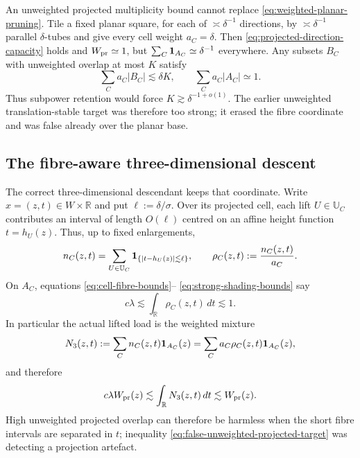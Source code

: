 \documentclass[11pt]{article}
\begin{document}
An unweighted projected multiplicity bound cannot replace
\eqref{eq:weighted-planar-pruning}.  Tile a fixed planar square, for each of
\(\asymp\delta^{-1}\) directions, by \(\asymp\delta^{-1}\) parallel
\(\delta\)-tubes and give every cell weight \(a_C=\delta\).  Then
\eqref{eq:projected-direction-capacity} holds and \(W_{\rm pr}\simeq1\), but
\(\sum_C{\bf1}_{A_C}\simeq\delta^{-1}\) everywhere.  Any subsets \(B_C\)
with unweighted overlap at most \(K\) satisfy
\begin{equation}\label{eq:false-unweighted-projected-target}
 \sum_Ca_C|B_C|\lesssim\delta K,
 \qquad
 \sum_Ca_C|A_C|\simeq1.
\end{equation}
Thus subpower retention would force \(K\gtrsim\delta^{-1+o(1)}\).  The earlier
unweighted translation-stable target was therefore too strong; it erased the
fibre coordinate and was false already over the planar base.

\subsection{The fibre-aware three-dimensional descent}

The correct three-dimensional descendant keeps that coordinate.  Write
\(x=(z,t)\in W\times\mathbb R\) and put \(\ell:=\delta/\sigma\).  Over its
projected cell, each lift \(U\in\mathbb U_C\) contributes an interval of length
\(O(\ell)\) centred on an affine height function \(t=h_U(z)\).  Thus, up to
fixed enlargements,
\begin{equation}\label{eq:affine-fibre-disintegration}
 n_C(z,t)
 =\sum_{U\in\mathbb U_C}{\bf1}_{\{|t-h_U(z)|\lesssim\ell\}},
 \qquad
 \rho_C(z,t):=\frac{n_C(z,t)}{a_C}.
\end{equation}
On \(A_C\), equations \eqref{eq:cell-fibre-bounds}--%
\eqref{eq:strong-shading-bounds} say
\begin{equation}\label{eq:normalized-affine-fibre-marginal}
 c\lambda
 \lesssim\int_{\mathbb R}\rho_C(z,t)\,dt
 \lesssim1.
\end{equation}
In particular the actual lifted load is the weighted mixture
\begin{equation}\label{eq:affine-fibre-lifted-load}
 N_3(z,t):=
 \sum_C n_C(z,t){\bf1}_{A_C}(z)
 =\sum_Ca_C\rho_C(z,t){\bf1}_{A_C}(z),
\end{equation}
and therefore
\begin{equation}\label{eq:affine-fibre-projected-marginal}
 c\lambda W_{\rm pr}(z)
 \lesssim\int_{\mathbb R}N_3(z,t)\,dt
 \lesssim W_{\rm pr}(z).
\end{equation}
High unweighted
projected overlap can therefore be harmless when the short fibre intervals
are separated in \(t\); inequality \eqref{eq:false-unweighted-projected-target}
was detecting a projection artefact.
\end{document}
